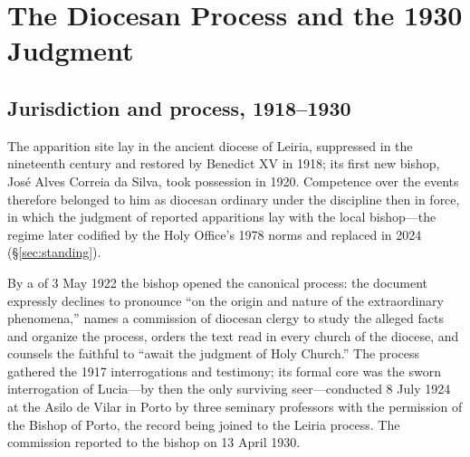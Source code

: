\section{The Diocesan Process and the 1930 Judgment}\label{sec:diocesan}

\subsection{Jurisdiction and process, 1918--1930}

The apparition site lay in the ancient diocese of Leiria, suppressed
in the nineteenth century and restored by Benedict XV in 1918; its
first new bishop, Jos\'e Alves Correia da Silva, took possession in
1920. Competence over the events therefore belonged to him as
diocesan ordinary under the discipline then in force, in which the
judgment of reported apparitions lay with the local bishop---the
regime later codified by the Holy Office's 1978 norms and replaced in
2024 (\S\ref{sec:standing}).

By a  of 3 May 1922 the bishop opened the canonical
process: the document expressly declines to pronounce ``on the origin
and nature of the extraordinary phenomena,'' names a commission of
diocesan clergy to study the alleged facts and organize the process,
orders the text read in every church of the diocese, and counsels the
faithful to ``await the judgment of Holy Church.'' The process
gathered the 1917 interrogations and testimony; its formal core was
the sworn interrogation of Lucia---by then the only surviving
seer---conducted 8 July 1924 at the Asilo de Vilar in Porto by three
seminary professors with the permission of the Bishop of Porto, the
record being joined to the Leiria process. The commission reported to
the bishop on 13 April 1930.

